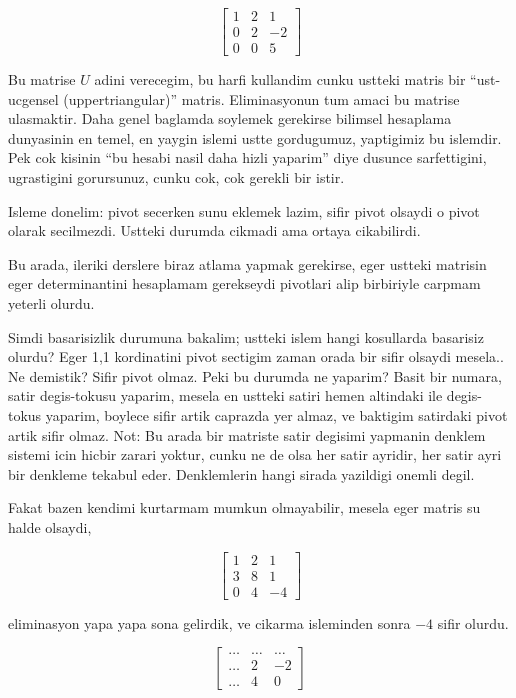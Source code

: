 \documentclass[12pt,fleqn]{article}\usepackage{../common}
\begin{document}
$$ 
\left[\begin{array}{rrr}
1 & 2 & 1 \\
0 & 2 & -2 \\
0 & 0 & 5
\end{array}\right]
 $$

Bu matrise $U$ adini verecegim, bu harfi kullandim cunku ustteki matris bir
``ust-ucgensel (uppertriangular)'' matris. Eliminasyonun tum amaci bu
matrise ulasmaktir. Daha genel baglamda soylemek gerekirse bilimsel
hesaplama dunyasinin en temel, en yaygin islemi ustte gordugumuz,
yaptigimiz bu islemdir. Pek cok kisinin ``bu hesabi nasil daha hizli
yaparim'' diye dusunce sarfettigini, ugrastigini gorursunuz, cunku cok, cok
gerekli bir istir. 

Isleme donelim: pivot secerken sunu eklemek lazim, sifir pivot olsaydi o
pivot olarak secilmezdi. Ustteki durumda cikmadi ama ortaya cikabilirdi. 

Bu arada, ileriki derslere biraz atlama yapmak gerekirse, eger ustteki
matrisin eger determinantini hesaplamam gerekseydi pivotlari alip
birbiriyle carpmam yeterli olurdu. 

Simdi basarisizlik durumuna bakalim; ustteki islem hangi kosullarda
basarisiz olurdu? Eger 1,1 kordinatini pivot sectigim zaman orada bir sifir
olsaydi mesela.. Ne demistik? Sifir pivot olmaz. Peki bu durumda ne
yaparim? Basit bir numara, satir degis-tokusu yaparim, mesela en ustteki
satiri hemen altindaki ile degis-tokus yaparim, boylece sifir artik
caprazda yer almaz, ve baktigim satirdaki pivot artik sifir olmaz. Not: Bu
arada bir matriste satir degisimi yapmanin denklem sistemi icin hicbir
zarari yoktur, cunku ne de olsa her satir ayridir, her satir ayri bir
denkleme tekabul eder. Denklemlerin hangi sirada yazildigi onemli degil.

Fakat bazen kendimi kurtarmam mumkun olmayabilir, mesela eger matris su
halde olsaydi, 

$$ 
\left[\begin{array}{rrr}
1 & 2 & 1 \\
3 & 8 & 1 \\
0 & 4 & -4
\end{array}\right]
 $$

eliminasyon yapa yapa sona gelirdik, ve cikarma isleminden sonra $-4$
sifir olurdu. 

$$ 
\left[\begin{array}{rrr}
    \dots & \dots & \dots \\
    \dots &  2 & -2 \\
    \dots & 4 &  0
  \end{array}\right]
$$
\end{document}
